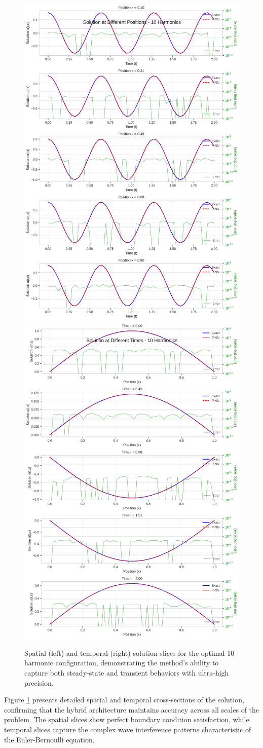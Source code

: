 \begin{figure}[ht]
    \centering
    \includegraphics[width = 0.49\linewidth]{figures/space_slices_10h.png}
    \includegraphics[width = 0.49\linewidth]{figures/time_slices_10h.png}
    \caption{Spatial (left) and temporal (right) solution slices for the optimal 10-harmonic configuration, demonstrating the method's ability to capture both steady-state and transient behaviors with ultra-high precision.}
    \label{fig:solution_slices}
\end{figure}

Figure \ref{fig:solution_slices} presents detailed spatial and temporal cross-sections of the solution, confirming that the hybrid architecture maintains accuracy across all scales of the problem. The spatial slices show perfect boundary condition satisfaction, while temporal slices capture the complex wave interference patterns characteristic of the Euler-Bernoulli equation.

